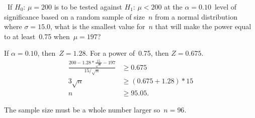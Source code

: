 \begin{problem}
  ~If $H_0$: ${\mu = 200}$ is to be tested against $H_1$: ${\mu < 200}$ at the ${\alpha = 0.10}$~level of significance based on a random sample of size~$n$ from a normal distribution where ${\sigma = 15.0}$, what is the smallest value for~$n$ that will make the power equal to at least~0.75 when~${\mu = 197}$?
\end{problem}

If ${\alpha = 0.10}$, then~${Z = 1.28}$.  For a power of~0.75, then ${Z=0.675}$.
\begin{align*}
  \frac{200 - 1.28 *\frac{15}{\sqrt{n}} - 197}{15 / \sqrt{n}} &\geq 0.675 \\
  3 \sqrt{n} &\geq ( 0.675 + 1.28) * 15 \\
  n &\geq 95.05 \text{.}
\end{align*}

The sample size must be a whole number larger so~$\boxed{n = 96}$.
